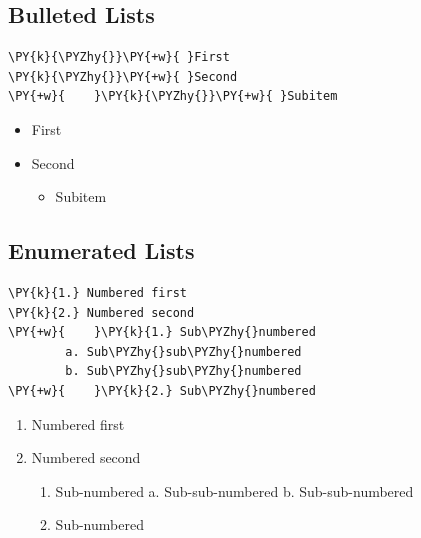 \documentclass[a4paper,twoside]{article}
\begin{document}
\subsection{Bulleted Lists}
\begin{tscode}[lang=md, engine=pygments]
\begin{Verbatim}[commandchars=\\\{\},breaklines, breakanywhere, commandchars=\\\{\}]
\PY{k}{\PYZhy{}}\PY{+w}{ }First
\PY{k}{\PYZhy{}}\PY{+w}{ }Second
\PY{+w}{    }\PY{k}{\PYZhy{}}\PY{+w}{ }Subitem
\end{Verbatim}
\end{tscode}
\begin{displayquote}
\begin{itemize}
\item First
\item Second
\begin{itemize}
\item Subitem
\end{itemize}
\end{itemize}
\end{displayquote}
\subsection{Enumerated Lists}
\begin{tscode}[lang=md, engine=pygments]
\begin{Verbatim}[commandchars=\\\{\},breaklines, breakanywhere, commandchars=\\\{\}]
\PY{k}{1.} Numbered first
\PY{k}{2.} Numbered second
\PY{+w}{    }\PY{k}{1.} Sub\PYZhy{}numbered
        a. Sub\PYZhy{}sub\PYZhy{}numbered
        b. Sub\PYZhy{}sub\PYZhy{}numbered
\PY{+w}{    }\PY{k}{2.} Sub\PYZhy{}numbered
\end{Verbatim}
\end{tscode}
\begin{displayquote}
\begin{enumerate}
\item Numbered first
\item Numbered second
\begin{enumerate}
\item Sub-numbered
a. Sub-sub-numbered
b. Sub-sub-numbered
\item Sub-numbered
\end{enumerate}
\end{enumerate}
\end{displayquote}
\end{document}
